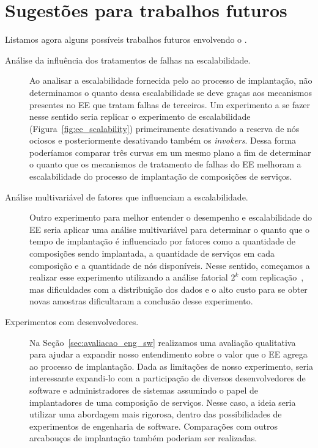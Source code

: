 \section{Sugestões para trabalhos futuros}

Listamos agora alguns possíveis trabalhos futuros envolvendo o \ee.

\begin{description}

\item[Análise da influência dos tratamentos de falhas na escalabilidade.] 
Ao analisar a escalabilidade fornecida pelo \ee ao processo de implantação,
não determinamos o quanto dessa escalabilidade se deve graças aos mecanismos 
presentes no EE que tratam falhas de terceiros.
Um experimento a se fazer nesse sentido seria replicar o experimento 
de escalabilidade (Figura~\ref{fig:ee_scalability})
primeiramente desativando a reserva de nós ociosos e posteriormente
desativando também os \emph{invokers}.
Dessa forma poderíamos comparar três curvas em um mesmo plano
a fim de determinar o quanto que os mecanismos de tratamento de falhas
do EE melhoram a escalabilidade do processo de implantação de composições de serviços.

\item[Análise multivariável de fatores que influenciam a escalabilidade.] 
Outro experimento para melhor entender o desempenho e escalabilidade do EE
seria aplicar uma análise multivariável para determinar o quanto
que o tempo de implantação é influenciado por fatores como a quantidade de composições
sendo implantada, a quantidade de serviços em cada composição e a quantidade
de nós disponíveis.
Nesse sentido, começamos a realizar esse experimento utilizando a análise fatorial $2^k$
com replicação~\cite{Jain20002kr}, mas dificuldades com a distribuição dos dados e o alto custo
para se obter novas amostras dificultaram a conclusão desse experimento.

\item[Experimentos com desenvolvedores.] 
Na Seção~\ref{sec:avaliacao_eng_sw} realizamos uma avaliação qualitativa para
ajudar a expandir nosso entendimento sobre o valor que o EE agrega ao processo de implantação.
Dada as limitações de nosso experimento, seria interessante expandi-lo
com a participação de diversos desenvolvedores de software
e administradores de sistemas assumindo o papel de implantadores de uma composição de serviços.
Nesse caso, a ideia seria utilizar uma abordagem mais rigorosa,
dentro das possibilidades de experimentos de engenharia de software.
Comparações com outros arcabouços de implantação também poderiam ser realizadas.


\end{description}
